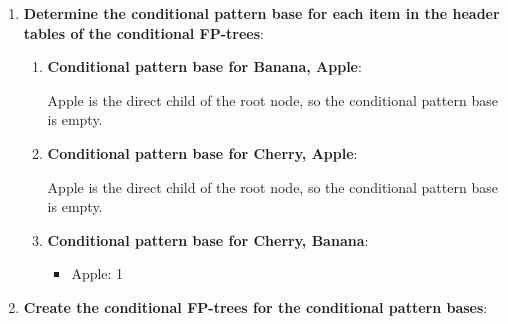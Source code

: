 \documentclass[
english,
smallborders
]{i6prcsht}
\begin{document}
\begin{solution}
\begin{enumerate}
\begin{enumerate}
\begin{enumerate}
\begin{center}
{
					                  }
				                  \end{center}
			            \end{enumerate}
		      \end{enumerate}

		\item \textbf{Determine the conditional pattern base for each item in the header tables of the conditional FP-trees}:


		      \begin{enumerate}
			      \item \textbf{Conditional pattern base for \glqq Banana, Apple\grqq }:

			            Apple is the direct child of the root node, so the conditional pattern base is empty.

			      \item \textbf{Conditional pattern base for \glqq Cherry, Apple\grqq }:

			            Apple is the direct child of the root node, so the conditional pattern base is empty.

			      \item \textbf{Conditional pattern base for \glqq Cherry, Banana\grqq }:

			            \begin{itemize}
				            \item Apple: 1
			            \end{itemize}
		      \end{enumerate}

		      \newpage

		\item \textbf{Create the conditional FP-trees for the conditional pattern bases}:


\end{enumerate}
\end{solution}
\end{document}
